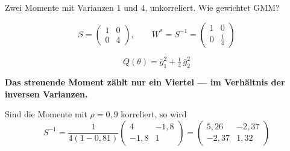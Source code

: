 \begin{aufgabe}
Zwei Momente mit Varianzen $1$ und $4$, unkorreliert. Wie gewichtet GMM?

\loesung
{}
\[ S = \begin{pmatrix} 1 & 0\\ 0 & 4\end{pmatrix}, \qquad W^{*} = S^{-1} = \begin{pmatrix} 1 & 0\\ 0 & \tfrac14\end{pmatrix} \]

\[ Q(\theta) = \bar g_1^{2} + \tfrac14\,\bar g_2^{2} \]

\begin{center}
\begin{minipage}{0.9\textwidth}
\textbf{Das streuende Moment zählt nur ein Viertel --- im Verhältnis der inversen Varianzen.}
\end{minipage}
\end{center}

Sind die Momente mit $\rho = 0{,}9$ korreliert, so wird
\[ S^{-1} = \frac{1}{4(1-0{,}81)}\begin{pmatrix} 4 & -1{,}8\\ -1{,}8 & 1\end{pmatrix} = \begin{pmatrix} 5{,}26 & -2{,}37\\ -2{,}37 & 1{,}32\end{pmatrix} \]

\begin{center}
\begin{minipage}{0.88\textwidth}
\end{minipage}
\end{center}
\end{aufgabe}

